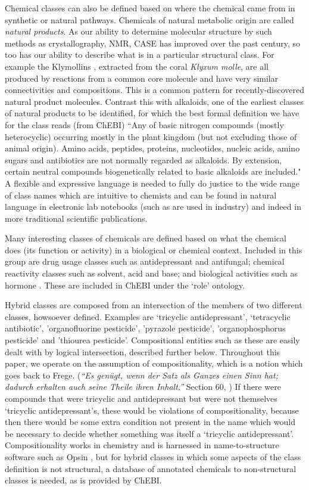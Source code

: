 \documentclass[10pt]{bmc_article}
\newenvironment{bmcformat}{\baselineskip20pt\sloppy\setboolean{publ}{false}}{\baselineskip20pt\sloppy}
\begin{document}
\begin{bmcformat}
Chemical classes can also be defined based on where the chemical came from in synthetic or natural pathways. Chemicals of natural metabolic origin are called \textit{natural products}.  As our ability to determine molecular structure by such methods as crystallography, NMR, CASE has improved over the past century, so too has our ability to describe what is in a particular structural class.  For example the Klymollins \cite{hsu2011}, extracted from the coral \textit{Klyxum molle}, are all produced by reactions from a common core molecule and have very similar connectivities and compositions. This is a common pattern for recently-discovered natural product molecules.  Contrast this with alkaloids, one of the earliest classes of natural products to be identified, for which the best formal definition we have for the class reads (from ChEBI) ``Any of basic nitrogen compounds (mostly heterocyclic) occurring mostly in the plant kingdom (but not excluding those of animal origin). Amino acids, peptides, proteins, nucleotides, nucleic acids, amino sugars and antibiotics are not normally regarded as alkaloids. By extension, certain neutral compounds biogenetically related to basic alkaloids are included." A flexible and expressive language is needed to fully do justice to the wide range of class names which are intuitive to chemists and can be found in natural language in electronic lab notebooks (such as are used in industry) and indeed in more traditional scientific publications. 

Many interesting classes of chemicals are defined based on what the chemical does (its function or activity) in a biological or chemical context. Included in this group are drug usage classes such as antidepressant and antifungal; chemical reactivity classes such as solvent, acid and base; and biological activities such as hormone \cite{batchelor2010}. These are included in ChEBI under the `role' ontology. 

Hybrid classes are composed from an intersection of the members of two different classes, howsoever defined.  Examples are `tricyclic antidepressant', `tetracyclic antibiotic', 'organofluorine pesticide', 'pyrazole pesticide', 'organophosphorus pesticide' and 'thiourea pesticide'. Compositional entities such as these are easily dealt with by logical intersection, described further below. 
Throughout this paper, we operate on the assumption of compositionality, which is a notion which goes back to Frege.  (\textit{``Es gen\"{u}gt, wenn der Satz als Ganzes einen Sinn hat; dadurch erhalten auch seine Theile ihren Inhalt.''} Section 60, \cite{Frege1884-FREGDA-3})
If there were compounds that were tricyclic and antidepressant but were not themselves `tricyclic antidepressant's, these would be violations of compositionality, because then there would be some extra condition not present in the name which would be necessary to decide whether something was itself a `tricyclic antidepressant'.
Compositionality works in chemistry and is harnessed in name-to-structure software such as Opsin \cite{lowe2011}, but for hybrid classes in which some aspects of the class definition is not structural, a database of annotated chemicals to non-structural classes is needed, as is provided by ChEBI. 


\end{bmcformat}
\end{document}
